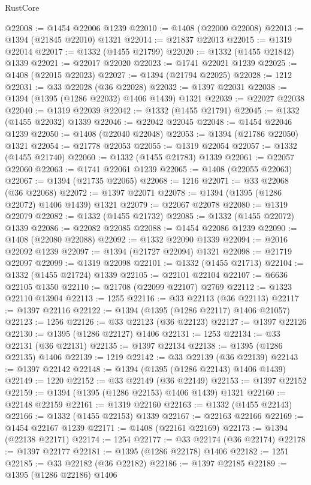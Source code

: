 \begin{lexlean}{RustCore}
\begin{coremodule}
@22008 := @1454 @22006 @1239
@22010 := @1408 (@22000 @22008)
@22013 := @1394 (@21845 @22010) @1321
@22014 := @21837 @22013
@22015 := @1319 @22014
@22017 := @1332 (@1455 @21799)
@22020 := @1332 (@1455 @21842) @1339
@22021 := @22017 @22020
@22023 := @1741 @22021 @1239
@22025 := @1408 (@22015 @22023)
@22027 := @1394 (@21794 @22025)
@22028 := 1212
@22031 := @33 @22028 (@36 @22028)
@22032 := @1397 @22031
@22038 := @1394 (@1395 (@1286 @22032) @1406 @1439) @1321
@22039 := @22027 @22038
@22040 := @1319 @22039
@22042 := @1332 (@1455 @21791)
@22045 := @1332 (@1455 @22032) @1339
@22046 := @22042 @22045
@22048 := @1454 @22046 @1239
@22050 := @1408 (@22040 @22048)
@22053 := @1394 (@21786 @22050) @1321
@22054 := @21778 @22053
@22055 := @1319 @22054
@22057 := @1332 (@1455 @21740)
@22060 := @1332 (@1455 @21783) @1339
@22061 := @22057 @22060
@22063 := @1741 @22061 @1239
@22065 := @1408 (@22055 @22063)
@22067 := @1394 (@21735 @22065)
@22068 := 1216
@22071 := @33 @22068 (@36 @22068)
@22072 := @1397 @22071
@22078 := @1394 (@1395 (@1286 @22072) @1406 @1439) @1321
@22079 := @22067 @22078
@22080 := @1319 @22079
@22082 := @1332 (@1455 @21732)
@22085 := @1332 (@1455 @22072) @1339
@22086 := @22082 @22085
@22088 := @1454 @22086 @1239
@22090 := @1408 (@22080 @22088)
@22092 := @1332 @22090 @1339
@22094 := @2016 @22092 @1239
@22097 := @1394 (@21727 @22094) @1321
@22098 := @21719 @22097
@22099 := @1319 @22098
@22101 := @1332 (@1455 @21713)
@22104 := @1332 (@1455 @21724) @1339
@22105 := @22101 @22104
@22107 := @6636 @22105 @1350
@22110 := @21708 (@22099 @22107) @2769
@22112 := @1323 @22110 @13904
@22113 := 1255
@22116 := @33 @22113 (@36 @22113)
@22117 := @1397 @22116
@22122 := @1394 (@1395 (@1286 @22117) @1406 @21057)
@22123 := 1256
@22126 := @33 @22123 (@36 @22123)
@22127 := @1397 @22126
@22130 := @1395 (@1286 @22127) @1406
@22131 := 1253
@22134 := @33 @22131 (@36 @22131)
@22135 := @1397 @22134
@22138 := @1395 (@1286 @22135) @1406
@22139 := 1219
@22142 := @33 @22139 (@36 @22139)
@22143 := @1397 @22142
@22148 := @1394 (@1395 (@1286 @22143) @1406 @1439)
@22149 := 1220
@22152 := @33 @22149 (@36 @22149)
@22153 := @1397 @22152
@22159 := @1394 (@1395 (@1286 @22153) @1406 @1439) @1321
@22160 := @22148 @22159
@22161 := @1319 @22160
@22163 := @1332 (@1455 @22143)
@22166 := @1332 (@1455 @22153) @1339
@22167 := @22163 @22166
@22169 := @1454 @22167 @1239
@22171 := @1408 (@22161 @22169)
@22173 := @1394 (@22138 @22171)
@22174 := 1254
@22177 := @33 @22174 (@36 @22174)
@22178 := @1397 @22177
@22181 := @1395 (@1286 @22178) @1406
@22182 := 1251
@22185 := @33 @22182 (@36 @22182)
@22186 := @1397 @22185
@22189 := @1395 (@1286 @22186) @1406

\end{coremodule}
\end{lexlean}
